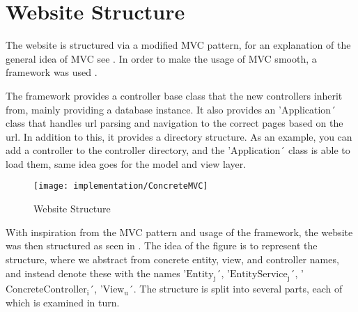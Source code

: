 \section{Website Structure}
The website is structured via a modified MVC pattern, for an explanation of the general idea of MVC see .
In order to make the usage of MVC smooth, a framework was used \citep{misc:mvc-framework}.

The framework provides a controller base class that the new controllers inherit from, mainly providing a database instance.
It also provides an 'Application´ class that handles url parsing and navigation to the correct pages based on the url.
In addition to this, it provides a directory structure. As an example, you can add a controller to the controller directory, and the 'Application´ class is able to load them, same idea goes for the model and view layer.

\begin{figure}
	\centering
	\texttt{[image: implementation/ConcreteMVC]}
	\caption{Website Structure}\label{fig:websitestructure}
\end{figure}

With inspiration from the MVC pattern and usage of the framework, the website was then structured as seen in .
The idea of the figure is to represent the structure, where we abstract from concrete entity, view, and controller names, and instead denote these with the names '$\text{Entity}_\text{j}$´, '$\text{EntityService}_\text{j}$´, '$\text{ConcreteController}_\text{i}$´, '$\text{View}_\text{u}$´.
The structure is split into several parts, each of which is examined in turn. 

